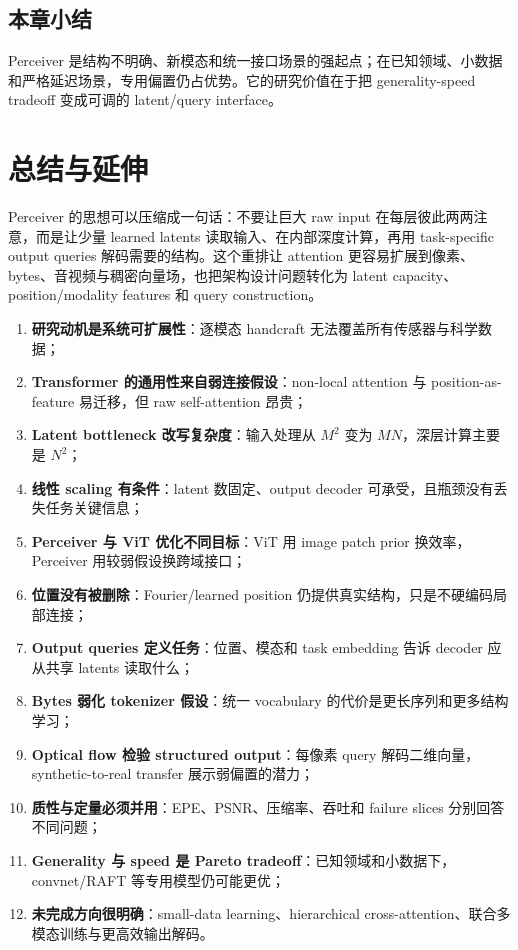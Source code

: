 \documentclass[a4paper]{article}
\begin{document}
\subsection{本章小结}

Perceiver 是结构不明确、新模态和统一接口场景的强起点；在已知领域、小数据和严格延迟场景，专用偏置仍占优势。它的研究价值在于把 generality-speed tradeoff 变成可调的 latent/query interface。

\section{总结与延伸}

Perceiver 的思想可以压缩成一句话：不要让巨大 raw input 在每层彼此两两注意，而是让少量 learned latents 读取输入、在内部深度计算，再用 task-specific output queries 解码需要的结构。这个重排让 attention 更容易扩展到像素、bytes、音视频与稠密向量场，也把架构设计问题转化为 latent capacity、position/modality features 和 query construction。

\begin{enumerate}
  \item \textbf{研究动机是系统可扩展性}：逐模态 handcraft 无法覆盖所有传感器与科学数据；
  \item \textbf{Transformer 的通用性来自弱连接假设}：non-local attention 与 position-as-feature 易迁移，但 raw self-attention 昂贵；
  \item \textbf{Latent bottleneck 改写复杂度}：输入处理从 $M^2$ 变为 $MN$，深层计算主要是 $N^2$；
  \item \textbf{线性 scaling 有条件}：latent 数固定、output decoder 可承受，且瓶颈没有丢失任务关键信息；
  \item \textbf{Perceiver 与 ViT 优化不同目标}：ViT 用 image patch prior 换效率，Perceiver 用较弱假设换跨域接口；
  \item \textbf{位置没有被删除}：Fourier/learned position 仍提供真实结构，只是不硬编码局部连接；
  \item \textbf{Output queries 定义任务}：位置、模态和 task embedding 告诉 decoder 应从共享 latents 读取什么；
  \item \textbf{Bytes 弱化 tokenizer 假设}：统一 vocabulary 的代价是更长序列和更多结构学习；
  \item \textbf{Optical flow 检验 structured output}：每像素 query 解码二维向量，synthetic-to-real transfer 展示弱偏置的潜力；
  \item \textbf{质性与定量必须并用}：EPE、PSNR、压缩率、吞吐和 failure slices 分别回答不同问题；
  \item \textbf{Generality 与 speed 是 Pareto tradeoff}：已知领域和小数据下，convnet/RAFT 等专用模型仍可能更优；
  \item \textbf{未完成方向很明确}：small-data learning、hierarchical cross-attention、联合多模态训练与更高效输出解码。
\end{enumerate}
\end{document}
